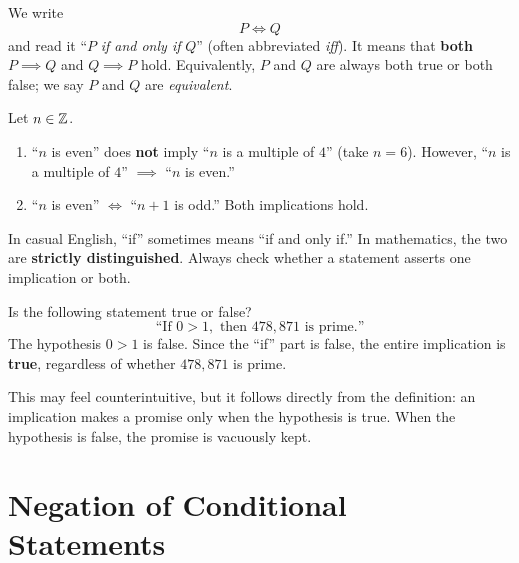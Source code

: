 \begin{definition}
\label{def:1-10}
We write
\[
  P \iff Q
\]
and read it ``$P$ \emph{if and only if} $Q$'' (often abbreviated \emph{iff}).  It means that \textbf{both} $P \implies Q$ and $Q \implies P$ hold.  Equivalently, $P$ and $Q$ are always both true or both false; we say $P$ and $Q$ are \emph{equivalent}.
\end{definition}

\begin{example}
\label{ex:1-10}
Let $n \in \mathbb{Z}$.
\begin{enumerate}[label=(\alph*)]
  \item ``$n$ is even'' does \textbf{not} imply ``$n$ is a multiple of $4$'' (take $n = 6$).  However, ``$n$ is a multiple of $4$'' $\implies$ ``$n$ is even.''
  \item ``$n$ is even'' $\iff$ ``$n + 1$ is odd.''  Both implications hold.
\end{enumerate}
\end{example}

\begin{remark}[Warning]
In casual English, ``if'' sometimes means ``if and only if.''  In mathematics, the two are \textbf{strictly distinguished}.  Always check whether a statement asserts one implication or both.
\end{remark}

\begin{example}
\label{ex:1-11}
Is the following statement true or false?
\[
  \text{``If } 0 > 1, \text{ then } 478{,}871 \text{ is prime.''}
\]
The hypothesis $0 > 1$ is false.  Since the ``if'' part is false, the entire implication is \textbf{true}, regardless of whether $478{,}871$ is prime.
\end{example}

\begin{remark}
This may feel counterintuitive, but it follows directly from the definition: an implication makes a promise only when the hypothesis is true.  When the hypothesis is false, the promise is vacuously kept.
\end{remark}

\section{Negation of Conditional Statements}
\label{sec:1.8}

